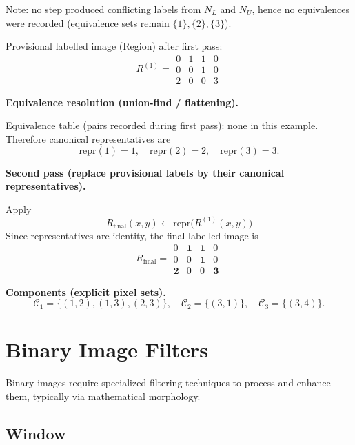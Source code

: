 {  \vspace{6pt}
  Note: no step produced conflicting labels from \(N_L\) and \(N_U\), hence no equivalences were recorded (equivalence sets remain \(\{1\},\{2\},\{3\}\)).

Provisional labelled image (Region) after first pass:
\[
R^{(1)}=
\begin{matrix}
0 & 1 & 1 & 0\\
0 & 0 & 1 & 0\\
2 & 0 & 0 & 3
\end{matrix}
\]

\textbf{Equivalence resolution (union-find / flattening).}

Equivalence table (pairs recorded during first pass): none in this example. Therefore canonical representatives are
\[
\mathrm{repr}(1)=1,\quad \mathrm{repr}(2)=2,\quad \mathrm{repr}(3)=3.
\]

\textbf{Second pass (replace provisional labels by their canonical representatives).}

Apply \[R_{\text{final}}(x,y)\leftarrow\mathrm{repr}\big(R^{(1)}(x,y)\big)\]
Since representatives are identity, the final labelled image is
\[
R_{\text{final}}=
\begin{matrix}
0 & \mathbf{1} & \mathbf{1} & 0\\
0 & 0 & \mathbf{1} & 0\\
\mathbf{2} & 0 & 0 & \mathbf{3}
\end{matrix}
\]

\textbf{Components (explicit pixel sets).}
\[
\mathcal{C}_1=\{(1,2),(1,3),(2,3)\},\quad
\mathcal{C}_2=\{(3,1)\},\quad
\mathcal{C}_3=\{(3,4)\}.
\]

}



\section{Binary Image Filters}

Binary images require specialized filtering techniques to process and enhance them, typically via mathematical morphology.

\subsection{Window}


